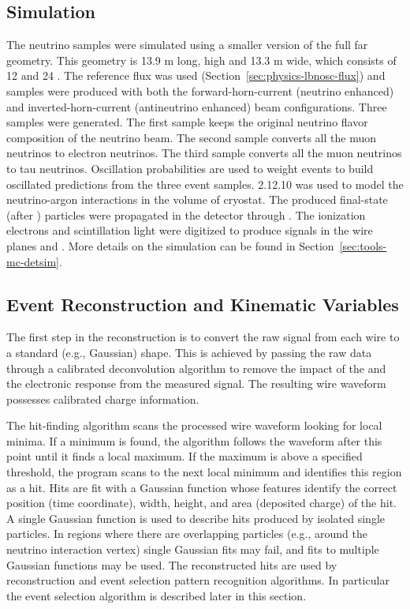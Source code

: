 \subsection{Simulation}
The neutrino samples were simulated using a smaller version of the full \nominalmodsize far  geometry. This geometry is 13.9 m long, \tpcheight high and 13.3 m wide, which consists of 12  and 24 . The reference flux was used (Section~\ref{sec:physics-lbnosc-flux}) and samples were produced with both the forward-horn-current (neutrino enhanced) and inverted-horn-current (antineutrino enhanced) beam configurations. Three samples were generated. The first sample keeps the original neutrino flavor composition of  the neutrino beam. The second sample converts all the muon neutrinos to electron neutrinos. The third sample converts all the muon neutrinos to tau neutrinos. Oscillation probabilities are used to weight  events to build oscillated  predictions from the three event samples.  2.12.10 was used to model the neutrino-argon interactions in the volume of cryostat. The produced final-state (after ) particles were propagated in the detector through . %
The ionization electrons and scintillation light were digitized to produce signals in the wire planes and . More details on the simulation can be found in Section~\ref{sec:tools-mc-detsim}.

\subsection{Event Reconstruction and Kinematic Variables}
The first step in the reconstruction is to convert the raw signal from each wire to a standard (e.g., Gaussian) shape. This is achieved by passing the raw data through a calibrated deconvolution algorithm to remove the impact of the  \efield and the electronic response from the measured signal. The resulting wire waveform possesses calibrated charge information. 

The hit-finding algorithm scans the processed wire waveform looking for local minima. If a minimum is found, the algorithm follows the waveform after this point until it finds a local maximum. If the maximum is above a specified threshold, the program scans to the next local minimum and identifies this region as a hit. Hits are fit with a Gaussian function whose features identify the correct position (time coordinate), width, height, and area (deposited charge) of the hit. A single Gaussian function is used to describe hits produced by isolated single particles. In regions where there are overlapping particles (e.g., around the neutrino interaction vertex) single Gaussian fits may fail, and fits to multiple Gaussian functions may be used. The reconstructed hits are used by reconstruction and event selection pattern recognition algorithms. In particular the  event selection algorithm is described later in this section.


